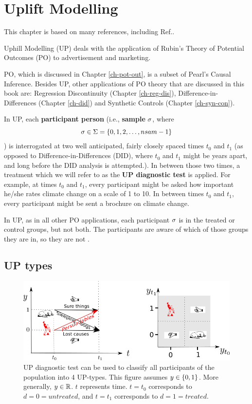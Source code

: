 \chapter{Uplift Modelling}
\label{ch-uplift}



This chapter is based 
on 
many references,
including Ref.\cite{uplift-2017, fei, wiki-uplift,jaros}.

Uphill Modelling (UP)
deals
with  the application of
Rubin's Theory of
Potential Outcomes (PO)
to advertisement and marketing.

PO, which is
discussed in Chapter \ref{ch-pot-out},
 is a subset
of Pearl's Causal Inference.
Besides UP, other  applications of PO theory
that are discussed in this book 
are: Regression Discontinuity (Chapter \ref{ch-reg-dis}),
Difference-in-Differences (Chapter \ref{ch-did})
and Synthetic Controls (Chapter \ref{ch-syn-con}).

In UP,
each {\bf participant person} (i.e., {\bf sample} $\sigma$,
where $$\sigma\in \Sigma=\{0,1,2, \ldots, nsam-1\}$$)
is interrogated at two well
anticipated, fairly closely spaced times
$t_0$ and $t_1$ (as opposed to 
Difference-in-Differences  (DID), where
$t_0$ and $t_1$ might
be years apart, and
long before the DID analysis is 
attempted.).
In between those two times,
a treatment which
we will refer to as the
{\bf UP diagnostic test} is applied.
For example,
at times $t_0$ and $t_1$,
every participant
might be asked
how important he/she rates climate 
change on a scale of 1 to 10.
In between times
$t_0$ and $t_1$,
every participant might
be sent a brochure on climate change.

In UP, as in all 
other PO applications, 
each participant
$\sigma$
is in the 
treated or control
groups, but not both.
The participants
are aware  of which
of those groups they are in,
so they are not .

\section{UP types}

\begin{figure}[h!]
\centering
\includegraphics[width=6in]
{uplift/uplift-y-t.png}
\caption{UP diagnostic test
can be used to classify
all participants of the
population into 4 UP-types.
This figure 
assumes $y\in \{0,1\}$.
More generally, $y\in { \mathbb{R}}$.
$t$ represents time. $t=t_0$
corresponds to $d=0=untreated$,
and $t=t_1$ corresponds to $d=1=treated$.} 
\label{fig-uplift-y-t}
\end{figure}

